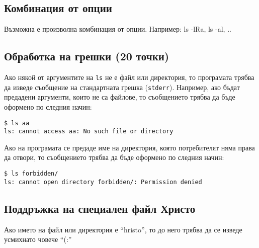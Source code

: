 \documentclass[a4paper,10pt]{article}
\begin{document}
\subsection{Комбинация от опции}
Възможна е произволна комбинация от опции. Например: ls -lRa, ls -al, ..

\subsection{Обработка на грешки (20 точки)}

Ако някой от аргументите на \lstinline{ls} не е файл или директория, то програмата трябва да изведе съобщение на стандартната грешка (\lstinline{stderr}). Например, ако бъдат предадени аргументи, които не са файлове, то
съобщението трябва да бъде оформено по следния начин:
\begin{verbatim}
$ ls aa
ls: cannot access aa: No such file or directory
\end{verbatim}

Ако на програмата се предаде име на директория, която потребителят няма права да отвори, то
съобщението трябва да бъде оформено по следния начин:
\begin{verbatim}
$ ls forbidden/
ls: cannot open directory forbidden/: Permission denied
\end{verbatim}

\color{white}


\subsection{Поддръжка на специален файл Христо}
Ако името на файл или директория е ``hristo'', то до него трябва да се изведе усмихнато човече ``(:''


\color{black}
\end{document}
